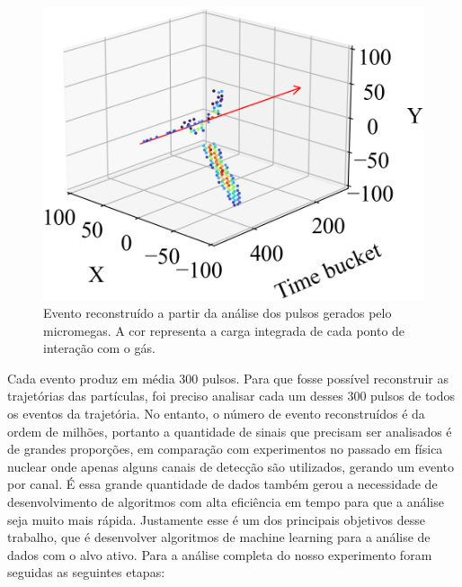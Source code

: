 \documentclass[a4paper,12pt,oneside]{book}
\begin{document}
\begin{figure}[H]
    \centering
    \includegraphics[scale = 0.40]{figs/event_cap_exp.png}
    \caption{Evento reconstruído a partir da análise dos pulsos gerados pelo micromegas. A cor representa a carga integrada de cada ponto de interação com o gás.}
    \label{fig:event_cap_exp}
\end{figure}

\par Cada evento produz em média 300 pulsos. Para que fosse possível reconstruir as trajetórias das partículas, foi preciso analisar cada um desses 300 pulsos de todos os eventos da trajetória. No entanto, o número de evento reconstruídos é da ordem de milhões, portanto a quantidade de sinais que precisam ser analisados é de grandes proporções, em comparação com experimentos no passado em física nuclear onde apenas alguns canais de detecção são utilizados, gerando um evento por canal. É essa grande quantidade de dados também gerou a necessidade de desenvolvimento de algoritmos com alta eficiência em tempo para que a análise seja muito mais rápida. Justamente esse é um dos principais objetivos desse trabalho, que é desenvolver algoritmos de machine learning para a análise de dados com o alvo ativo. Para a análise completa do nosso experimento foram seguidas as seguintes etapas:

\end{document}
